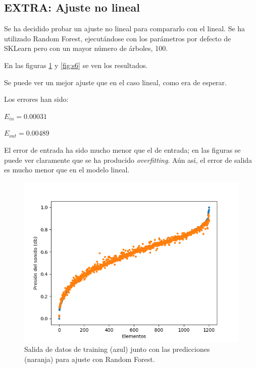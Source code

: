 \documentclass[12pt,spanish]{article} %
\begin{document}
\subsection{EXTRA: Ajuste no lineal}

Se ha decidido probar un ajuste no lineal para compararlo con el lineal. Se ha utilizado Random Forest, ejecutándose con los parámetros por defecto de SKLearn pero con un mayor número de árboles, 100.

En las figuras \ref{fig:s5} y \ref{fig:s6} se ven los resultados.

Se puede ver un mejor ajuste que en el caso lineal, como era de esperar.

Los errores han sido:

$E_{in} = 0.00031$

$E_{out} = 0.00489$

El error de entrada ha sido mucho menor que el de entrada; en las figuras se puede ver claramente que se ha producido \textit{overfitting}. Aún así, el error de salida es mucho menor que en el modelo lineal.

\begin{figure}[H]
  \begin{center}
  \includegraphics[scale=0.8]{s5}
  \caption{Salida de datos de training (azul) junto con las predicciones (naranja) para ajuste con Random Forest.}
  \label{fig:s5}
  \end{center}
\end{figure}
\end{document}
